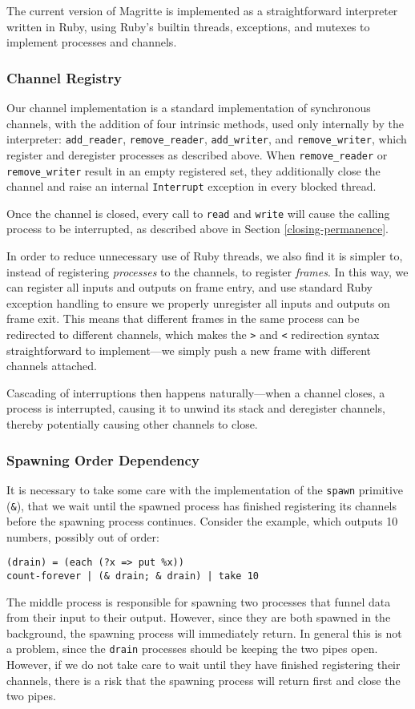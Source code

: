 \documentclass[english,preprint,JIP,uplatex]{ipsj}
\begin{document}
The current version of Magritte is implemented as a straightforward interpreter written in Ruby, using Ruby's builtin threads, exceptions, and mutexes to implement processes and channels.

\subsubsection{Channel Registry}\noindent
Our channel implementation is a standard implementation of synchronous channels, with the addition of four intrinsic methods, used only internally by the interpreter: \verb/add_reader/, \verb/remove_reader/, \verb/add_writer/, and \verb/remove_writer/, which register and deregister processes as described above. When \verb/remove_reader/ or \verb/remove_writer/ result in an empty registered set, they additionally close the channel and raise an internal \verb/Interrupt/ exception in every blocked thread.

Once the channel is closed, every call to \verb/read/ and \verb/write/ will cause the calling process to be interrupted, as described above in Section \ref{closing-permanence}.

In order to reduce unnecessary use of Ruby threads, we also find it is simpler to, instead of registering \emph{processes} to the channels, to register \emph{frames}. In this way, we can register all inputs and outputs on frame entry, and use standard Ruby exception handling to ensure we properly unregister all inputs and outputs on frame exit. This means that different frames in the same process can be redirected to different channels, which makes the \verb/>/ and \verb/</ redirection syntax straightforward to implement---we simply push a new frame with different channels attached.

Cascading of interruptions then happens naturally---when a channel closes, a process is interrupted, causing it to unwind its stack and deregister channels, thereby potentially causing other channels to close.

\subsubsection{Spawning Order Dependency}\noindent
It is necessary to take some care with the implementation of the \verb/spawn/ primitive (\verb/&/), that we wait until the spawned process has finished registering its channels before the spawning process continues. Consider the example, which outputs 10 numbers, possibly out of order:
\begin{lstlisting}
(drain) = (each (?x => put %x))
count-forever | (& drain; & drain) | take 10
\end{lstlisting}
\noindent
The middle process is responsible for spawning two processes that funnel data from their input to their output. However, since they are both spawned in the background, the spawning process will immediately return. In general this is not a problem, since the \verb/drain/ processes should be keeping the two pipes open. However, if we do not take care to wait until they have finished registering their channels, there is a risk that the spawning process will return first and close the two pipes.
\end{document}
